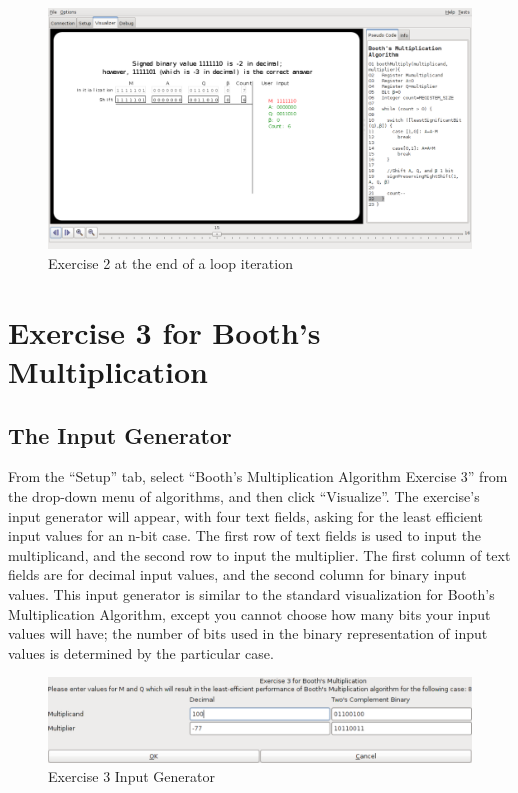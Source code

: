 \documentclass{article}
\begin{document}
\begin{figure}[h]
\centering
\includegraphics[scale=0.4]{ex2incorrect.pdf}
\caption{Exercise 2 at the end of a loop iteration}
\end{figure}

\pagebreak

\section{Exercise 3 for Booth's Multiplication}
\subsection{The Input Generator}
From the ``Setup'' tab, select ``Booth's Multiplication Algorithm Exercise 3'' from the drop-down menu of algorithms, and then click ``Visualize''.
The exercise's input generator will appear, with four text fields, asking for the least efficient input values for an n-bit case.
The first row of text fields is used to input the multiplicand, and the second row to input the multiplier.
The first column of text fields are for decimal input values, and the second column for binary input values.
This input generator is similar to the standard visualization for Booth's Multiplication Algorithm, except you cannot choose how many bits your input values will have; the number of bits used in the binary representation of input values is determined by the particular case.

\begin{figure}[h]
\centering
\includegraphics[scale=0.4]{ex3ingen.pdf}
\caption{Exercise 3 Input Generator}
\end{figure}
\end{document}
